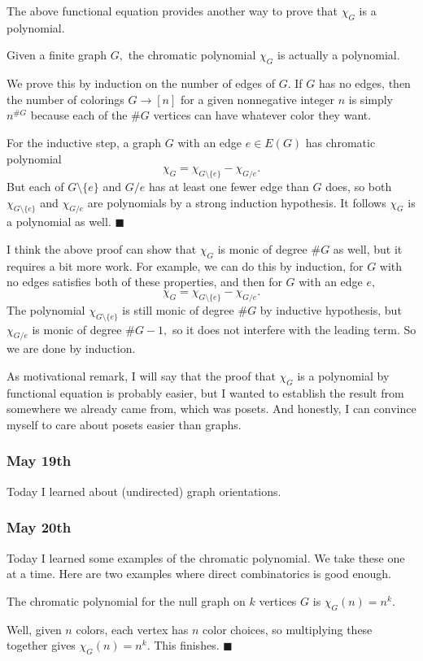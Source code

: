The above functional equation provides another way to prove that $\chi_G$ is a polynomial.
\begin{proposition}
    Given a finite graph $G,$ the chromatic polynomial $\chi_G$ is actually a polynomial.
\end{proposition}
We prove this by induction on the number of edges of $G.$ If $G$ has no edges, then the number of colorings $G\to[n]$ for a given nonnegative integer $n$ is simply $n^{\#G}$ because each of the $\#G$ vertices can have whatever color they want.

For the inductive step, a graph $G$ with an edge $e\in E(G)$ has chromatic polynomial
\[\chi_G=\chi_{G\setminus\{e\}}-\chi_{G/e}.\]
But each of $G\setminus\{e\}$ and $G/e$ has at least one fewer edge than $G$ does, so both $\chi_{G\setminus\{e\}}$ and $\chi_{G/e}$ are polynomials by a strong induction hypothesis. It follows $\chi_G$ is a polynomial as well. $\blacksquare$

I think the above proof can show that $\chi_G$ is monic of degree $\#G$ as well, but it requires a bit more work. For example, we can do this by induction, for $G$ with no edges satisfies both of these properties, and then for $G$ with an edge $e,$
\[\chi_G=\chi_{G\setminus\{e\}}-\chi_{G/e}.\]
The polynomial $\chi_{G\setminus\{e\}}$ is still monic of degree $\#G$ by inductive hypothesis, but $\chi_{G/e}$ is monic of degree $\#G-1,$ so it does not interfere with the leading term. So we are done by induction.

As motivational remark, I will say that the proof that $\chi_G$ is a polynomial by functional equation is probably easier, but I wanted to establish the result from somewhere we already came from, which was posets. And honestly, I can convince myself to care about posets easier than graphs.

\subsubsection{May 19th}
Today I learned about (undirected) graph orientations. \todo{}

\subsubsection{May 20th}
Today I learned some examples of the chromatic polynomial. We take these one at a time. Here are two examples where direct combinatorics is good enough.
\begin{proposition}
    The chromatic polynomial for the null graph on $k$ vertices $G$ is $\chi_G(n)=n^k.$
\end{proposition}
Well, given $n$ colors, each vertex has $n$ color choices, so multiplying these together gives $\chi_G(n)=n^k.$ This finishes. $\blacksquare$

